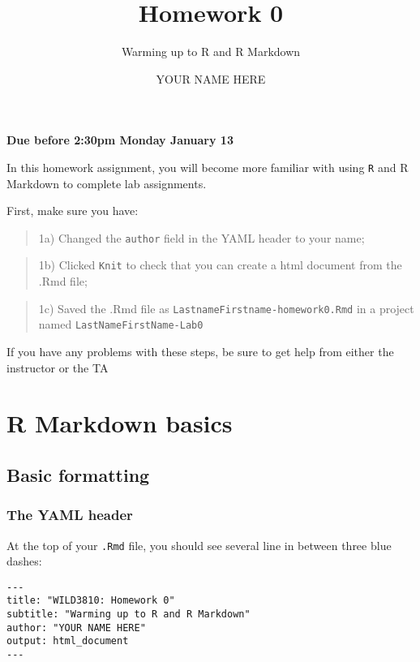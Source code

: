 \documentclass[]{article}
\title{Homework 0}
\subtitle{Warming up to R and R Markdown}
\author{YOUR NAME HERE}
\date{}
\begin{document}
\maketitle

\textbf{Due before 2:30pm Monday January 13}

In this homework assignment, you will become more familiar with using
\texttt{R} and R Markdown to complete lab assignments.

First, make sure you have:

\begin{quote}
1a) Changed the \texttt{author} field in the YAML header to your name;
\end{quote}

\begin{quote}
1b) Clicked \texttt{Knit} to check that you can create a html document
from the .Rmd file;
\end{quote}

\begin{quote}
1c) Saved the .Rmd file as \texttt{LastnameFirstname-homework0.Rmd} in a
project named \texttt{LastNameFirstName-Lab0}
\end{quote}

If you have any problems with these steps, be sure to get help from
either the instructor or the TA

\hypertarget{r-markdown-basics}{%
\section{R Markdown basics}\label{r-markdown-basics}}

\hypertarget{basic-formatting}{%
\subsection{Basic formatting}\label{basic-formatting}}

\hypertarget{the-yaml-header}{%
\subsubsection{The YAML header}\label{the-yaml-header}}

At the top of your \texttt{.Rmd} file, you should see several line in
between three blue dashes:

\begin{verbatim}
---
title: "WILD3810: Homework 0"
subtitle: "Warming up to R and R Markdown"
author: "YOUR NAME HERE"
output: html_document
---
\end{verbatim}
\end{document}
